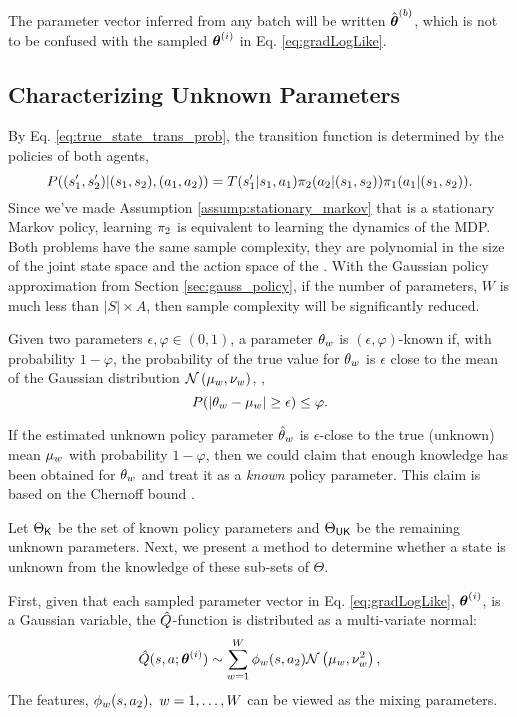 \begin{remark}
	The parameter vector inferred from any batch will be written $\hat{\boldsymbol{\mathbb{\theta}}}^{(b)}$, which is not to
	be confused with the sampled $\boldsymbol{\mathbb{\theta}}^{(i)}$ in Eq. \ref{eq:gradLogLike}.
\end{remark}


\subsection{Characterizing Unknown Parameters}\label{sec:unknown_params}
By Eq. \ref{eq:true_state_trans_prob}, the transition function is determined by the policies of both agents,
\[
P((s_1',s_2')|(s_1,s_2),(a_1,a_2)) = T(s_1'|s_1,a_1) \pi_{2}(a_2|(s_1,s_2))\pi_{1}(a_1|(s_1,s_2)).
\]
Since we've made Assumption \ref{assump:stationary_markov} that  is a stationary Markov policy, learning
$\pi_{2}$ is equivalent to learning the dynamics of the MDP. Both problems have the same sample complexity, they
are polynomial in the size of the joint state space and the action space of the . With the Gaussian policy
approximation from Section \ref{sec:gauss_policy}, if the number of parameters, $W$ is much less than $|S|\times A$,
then sample complexity will be significantly reduced.

\begin{definition}
	Given two parameters $\epsilon, \varphi \in (0,1)$, a parameter $\theta_{w}$ is $(\epsilon,
	\varphi)$-known if, with probability $1-\varphi$, the probability of the true value for $\theta_{w}$ is
	$\epsilon$ close to the mean of the Gaussian distribution $\mathcal{N}\left(\mu_{w}, \nu_{w}\right)$, \ie,
	\[
	P(\lvert\theta_{w} - \mu_{w}\rvert \ge \epsilon) \le \varphi.
	\]
\end{definition}

If the estimated unknown policy parameter $\hat{\theta}_w$ is $\epsilon$-close to the true (unknown) mean
$\mu_{w}$ with probability $1-\varphi$, then we could claim  that enough knowledge has been obtained for
$\theta_{w}$ and treat it as a \emph{known} policy parameter. This claim is based on the Chernoff bound
\cite{kobayashi2011probability}.

Let $\Theta_{\mathsf{K}}$ be the set of known policy parameters and $\Theta_{\mathsf{UK}}$ be the remaining unknown
parameters.  Next, we present a method to determine whether a state is unknown from the knowledge of these sub-sets
of $\Theta$.

First, given that each sampled parameter vector in Eq. \ref{eq:gradLogLike}, $\boldsymbol{\mathbb{\theta}}^{(i)}$, is a Gaussian
variable, the $\hat{Q}$-function is distributed as a multi-variate normal:
\[
\hat{Q}(s,a ;\boldsymbol{\mathbb{\theta}}^{(i)}) \sim \sum_{w=1}^W \phi_{w}(s,a_2) \mathcal{N}\left(\mu_w, \nu_w^2\right),
\]
The features, $\phi_{w}(s,a_2),\ w=1,\ldots, W$ can be viewed as the mixing parameters.

